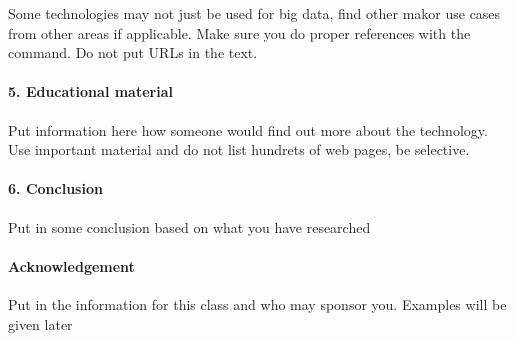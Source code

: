 \documentclass[9pt,twocolumn,twoside]{styles/osajnl}
\begin{document}
Some technologies may not just be used for big data, find other makor
use cases from other areas if applicable.  Make sure you do proper
references with the \cite{?} command. Do not put URLs in the text.

\paragraph{5. Educational material}

Put information here how someone would find out more about the
technology. Use important material and do not list hundrets of web
pages, be selective.

\paragraph{6. Conclusion}

Put in some conclusion based on what you have researched

\paragraph{Acknowledgement}

Put in the information for this class and who may sponsor
you. Examples will be given later
\end{document}

